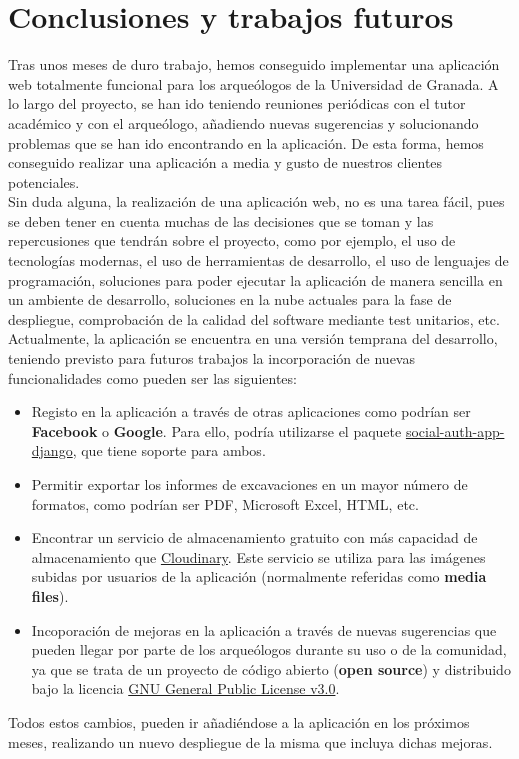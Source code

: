 \chapter{Conclusiones y trabajos futuros}
Tras unos meses de duro trabajo, hemos conseguido implementar una aplicación web totalmente
funcional para los arqueólogos de la Universidad de Granada. A lo largo del proyecto, se han
ido teniendo reuniones periódicas con el tutor académico y con el arqueólogo, añadiendo
nuevas sugerencias y solucionando problemas que se han ido encontrando en la aplicación. De
esta forma, hemos conseguido realizar una aplicación a media y gusto de nuestros clientes
potenciales. \\

Sin duda alguna, la realización de una aplicación web, no es una tarea fácil, pues se deben
tener en cuenta muchas de las decisiones que se toman y las repercusiones que tendrán sobre
el proyecto, como por ejemplo, el uso de tecnologías modernas, el uso de herramientas de
desarrollo, el uso de lenguajes de programación, soluciones para poder ejecutar la aplicación
de manera sencilla en un ambiente de desarrollo, soluciones en la nube actuales para la
fase de despliegue, comprobación de la calidad del software mediante test unitarios, etc. \\

Actualmente, la aplicación se encuentra en una versión temprana del desarrollo, teniendo
previsto para futuros trabajos la incorporación de nuevas funcionalidades como pueden ser
las siguientes:

    \begin{itemize}
        \item Registo en la aplicación a través de otras aplicaciones como podrían ser
        \textbf{Facebook} o \textbf{Google}. Para ello, podría utilizarse el paquete
        \href{https://python-social-auth.readthedocs.io/en/latest/configuration/django.html}
        {social-auth-app-django}, que tiene soporte para ambos.

        \item Permitir exportar los informes de excavaciones en un mayor número de formatos,
        como podrían ser PDF, Microsoft Excel, HTML, etc.

        \item Encontrar un servicio de almacenamiento gratuito con más capacidad de
        almacenamiento que \href{https://cloudinary.com/}{Cloudinary}. Este servicio se
        utiliza para las imágenes subidas por usuarios de la aplicación (normalmente
        referidas como \textbf{media files}).

        \item Incoporación de mejoras en la aplicación a través de nuevas sugerencias que
        pueden llegar por parte de los arqueólogos durante su uso o de la comunidad, ya que
        se trata de un proyecto de código abierto (\textbf{open source}) y distribuido bajo
        la licencia \href{https://www.gnu.org/licenses/gpl-3.0.html}{GNU General Public
        License v3.0}.
    \end{itemize}

Todos estos cambios, pueden ir añadiéndose a la aplicación en los próximos meses, realizando
un nuevo despliegue de la misma que incluya dichas mejoras.

